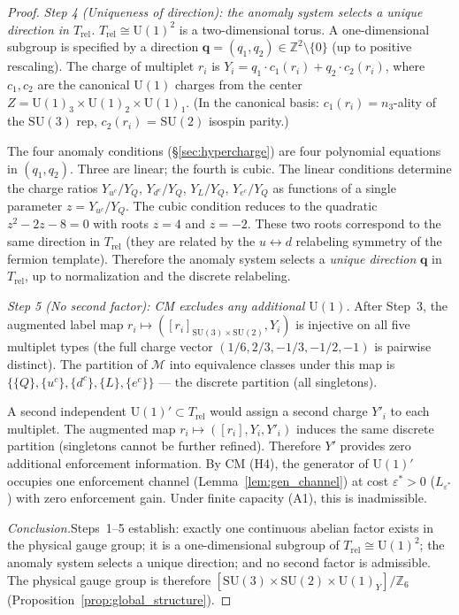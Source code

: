 \documentclass[11pt,a4paper]{article}
\theoremstyle{definition}
\newcommand{\SU}{\mathrm{SU}}
\newcommand{\U}{\mathrm{U}}
\begin{document}
\begin{proof}
\textit{Step 4 (Uniqueness of direction): the anomaly system
selects a unique direction in $T_{\mathrm{rel}}$.}\quad
$T_{\mathrm{rel}} \cong \mathrm{U}(1)^2$ is a two-dimensional torus.
A one-dimensional subgroup is specified by a direction
$\mathbf{q} = (q_1, q_2) \in \mathbb{Z}^2 \setminus \{0\}$ (up to
positive rescaling).  The charge of multiplet $r_i$ is
$Y_i = q_1 \cdot c_1(r_i) + q_2 \cdot c_2(r_i)$, where
$c_1, c_2$ are the canonical $\mathrm{U}(1)$ charges from the
center $Z = \mathrm{U}(1)_3 \times \mathrm{U}(1)_2 \times
\mathrm{U}(1)_1$.  (In the canonical basis:
$c_1(r_i) = n_3$-ality of the $\SU(3)$ rep, $c_2(r_i)$ =
$\SU(2)$ isospin parity.)

The four anomaly conditions (\S\ref{sec:hypercharge}) are four
polynomial equations in $(q_1, q_2)$.  Three are linear; the
fourth is cubic.  The linear conditions determine the charge
ratios $Y_{u^c}/Y_Q$, $Y_{d^c}/Y_Q$, $Y_L/Y_Q$, $Y_{e^c}/Y_Q$
as functions of a single parameter $z = Y_{u^c}/Y_Q$.  The cubic
condition reduces to the quadratic $z^2 - 2z - 8 = 0$ with roots
$z = 4$ and $z = -2$.  These two roots correspond to the same
direction in $T_{\mathrm{rel}}$ (they are related by the
$u \leftrightarrow d$ relabeling symmetry of the fermion template).
Therefore the anomaly system selects a \emph{unique direction}
$\mathbf{q}$ in $T_{\mathrm{rel}}$, up to normalization and the
discrete relabeling.

\textit{Step 5 (No second factor): CM excludes any additional
$\U(1)$.}\quad
After Step~3, the augmented label map
$r_i \mapsto ([r_i]_{\SU(3) \times \SU(2)}, Y_i)$ is injective on
all five multiplet types (the full charge vector
$(1/6, 2/3, -1/3, -1/2, -1)$ is pairwise distinct).  The partition of
$\mathcal{M}$ into equivalence classes under this map is
$\{\{Q\}, \{u^c\}, \{d^c\}, \{L\}, \{e^c\}\}$ --- the discrete
partition (all singletons).

A second independent $\U(1)' \subset T_{\mathrm{rel}}$ would assign
a second charge $Y'_i$ to each multiplet.  The augmented map
$r_i \mapsto ([r_i], Y_i, Y'_i)$ induces the same discrete
partition (singletons cannot be further refined).  Therefore $Y'$
provides zero additional enforcement information.  By CM (H4), the
generator of $\U(1)'$ occupies one enforcement channel
(Lemma~\ref{lem:gen_channel}) at cost $\varepsilon^* > 0$
($L_{\varepsilon^*}$) with zero enforcement gain.  Under finite
capacity (A1), this is inadmissible.

\textit{Conclusion.}\quad Steps~1--5 establish: exactly one
continuous abelian factor exists in the physical gauge group; it is a
one-dimensional subgroup of $T_{\mathrm{rel}} \cong \mathrm{U}(1)^2$;
the anomaly system selects a unique direction; and no second factor is
admissible.  The physical gauge group is therefore
$[\SU(3) \times \SU(2) \times \U(1)_Y] / \mathbb{Z}_6$
(Proposition~\ref{prop:global_structure}).
\end{proof}
\end{document}
